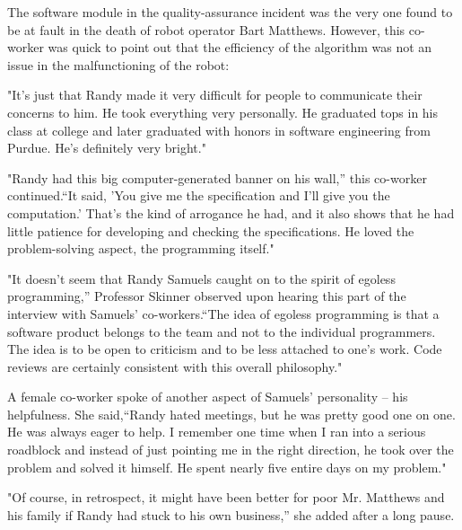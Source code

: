 The software module in the quality-assurance incident was the very one found to be at fault in the death of robot operator Bart Matthews. However, this co-worker was quick to point out that the efficiency of the algorithm was not an issue in the malfunctioning of the robot:

"It's just that Randy made it very difficult for people to communicate their concerns to him. He took everything very personally. He graduated tops in his class at college and later graduated with honors in software engineering from Purdue. He's definitely very bright."

"Randy had this big computer-generated banner on his wall,'' this co-worker continued.``It said, 'You give me the specification and I'll give you the computation.' That's the kind of arrogance he had, and it also shows that he had little patience for developing and checking the specifications. He loved the problem-solving aspect, the programming itself."

"It doesn't seem that Randy Samuels caught on to the spirit of egoless programming,'' Professor Skinner observed upon hearing this part of the interview with Samuels' co-workers.``The idea of egoless programming is that a software product belongs to the team and not to the individual programmers. The idea is to be open to criticism and to be less attached to one's work. Code reviews are certainly consistent with this overall philosophy."

A female co-worker spoke of another aspect of Samuels' personality -- his helpfulness. She said,``Randy hated meetings, but he was pretty good one on one. He was always eager to help. I remember one time when I ran into a serious roadblock and instead of just pointing me in the right direction, he took over the problem and solved it himself. He spent nearly five entire days on my problem."

"Of course, in retrospect, it might have been better for poor Mr. Matthews and his family if Randy had stuck to his own business,'' she added after a long pause.
